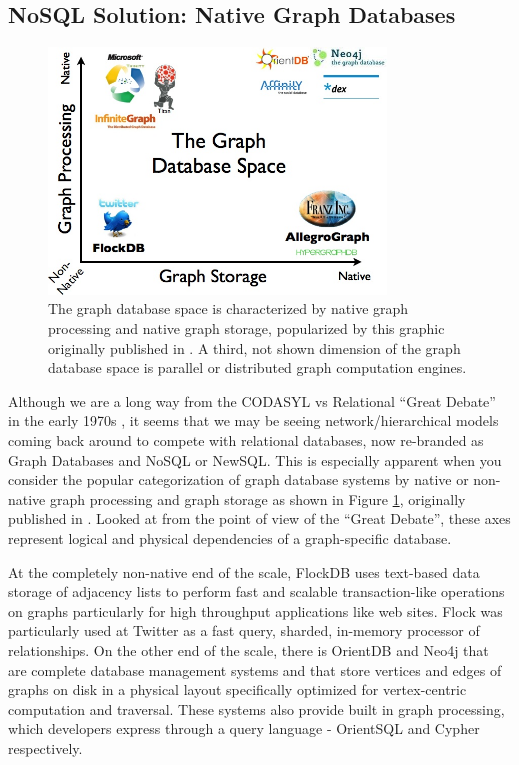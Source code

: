 \documentclass[11pt,letterpaper]{article}
\begin{document}
\subsection*{NoSQL Solution: Native Graph Databases}

\begin{figure}
	\centering
    \includegraphics[width=0.80\textwidth]{figures/graphdb_space.jpg}
    \caption{\textsf{The graph database space is characterized by native graph processing and native graph storage, popularized by this graphic originally published in \cite{robinson_graph_2013}. A third, not shown dimension of the graph database space is parallel or distributed graph computation engines.}}
    \label{fig:graphdb_space}
\end{figure}

Although we are a long way from the CODASYL vs Relational “Great Debate” in the early 1970s \cite{stonebraker_what_2005}, it seems that we may be seeing network/hierarchical models coming back around to compete with relational databases, now re-branded as Graph Databases and NoSQL or NewSQL. This is especially apparent when you consider the popular categorization of graph database systems by native or non-native graph processing and graph storage as shown in Figure \ref{fig:graphdb_space}, originally published in \cite{robinson_graph_2013}. Looked at from the point of view of the “Great Debate”, these axes represent logical and physical dependencies of  a graph-specific database.

At the completely non-native end of the scale, FlockDB \cite{kallen_flockdb_2012} uses text-based data storage of adjacency lists to perform fast and scalable transaction-like operations on graphs particularly for high throughput applications like web sites. Flock was particularly used at Twitter as a fast query, sharded, in-memory processor of relationships. On the other end of the scale, there is OrientDB \cite{_orientdb_2015} and Neo4j \cite{eifrem_neo4j_2014} that are complete database management systems and that store vertices and edges of graphs on disk in a physical layout specifically optimized for vertex-centric computation and traversal. These systems also provide built in graph processing, which developers express through a query language - OrientSQL and Cypher respectively.
\end{document}
